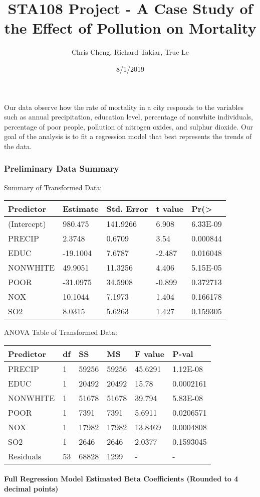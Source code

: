 \documentclass[]{article}
\title{STA108 Project - A Case Study of the Effect of Pollution on Mortality}
\author{Chris Cheng, Richard Takiar, Truc Le}
\date{8/1/2019}
\let\oldparagraph\paragraph
\renewcommand{\paragraph}[1]{\oldparagraph{#1}\mbox{}}
\begin{document}
\maketitle

Our data observe how the rate of mortality in a city responds to the
variables such as annual precipitation, education level, percentage of
nonwhite individuals, percentage of poor people, pollution of nitrogen
oxides, and sulphur dioxide. Our goal of the analysis is to fit a
regression model that best represents the trends of the data.

\subsubsection{\texorpdfstring{\textbf{Preliminary Data
Summary}}{Preliminary Data Summary}}\label{preliminary-data-summary}

Summary of Transformed Data:

\begin{longtable}[]{@{}lllll@{}}
\toprule
Predictor & Estimate & Std. Error & t value &
Pr(\textgreater{}\tabularnewline
\midrule
\endhead
(Intercept) & 980.475 & 141.9266 & 6.908 & 6.33E-09\tabularnewline
PRECIP & 2.3748 & 0.6709 & 3.54 & 0.000844\tabularnewline
EDUC & -19.1004 & 7.6787 & -2.487 & 0.016048\tabularnewline
NONWHITE & 49.9051 & 11.3256 & 4.406 & 5.15E-05\tabularnewline
POOR & -31.0975 & 34.5908 & -0.899 & 0.372713\tabularnewline
NOX & 10.1044 & 7.1973 & 1.404 & 0.166178\tabularnewline
SO2 & 8.0315 & 5.6263 & 1.427 & 0.159305\tabularnewline
\bottomrule
\end{longtable}

ANOVA Table of Transformed Data:

\begin{longtable}[]{@{}llllll@{}}
\toprule
Predictor & df & SS & MS & F value & P-val\tabularnewline
\midrule
\endhead
PRECIP & 1 & 59256 & 59256 & 45.6291 & 1.12E-08\tabularnewline
EDUC & 1 & 20492 & 20492 & 15.78 & 0.0002161\tabularnewline
NONWHITE & 1 & 51678 & 51678 & 39.794 & 5.83E-08\tabularnewline
POOR & 1 & 7391 & 7391 & 5.6911 & 0.0206571\tabularnewline
NOX & 1 & 17982 & 17982 & 13.8469 & 0.0004808\tabularnewline
SO2 & 1 & 2646 & 2646 & 2.0377 & 0.1593045\tabularnewline
Residuals & 53 & 68828 & 1299 & - & -\tabularnewline
\bottomrule
\end{longtable}

\paragraph{Full Regression Model Estimated Beta Coefficients (Rounded to
4 decimal
points)}\label{full-regression-model-estimated-beta-coefficients-rounded-to-4-decimal-points}
\end{document}
